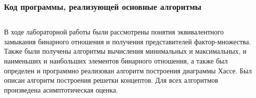 \documentclass[bachelor, och, labwork]{shiza}
\begin{document}
        \subsubsection{Код программы, реализующей основные алгоритмы}
            \inputminted{python}{code/lab2.py}
      


\conclusion
В ходе лабораторной работы были рассмотрены понятия эквивалентного замыкания
бинарного отношения и получения представителей фактор-множества. Также были
получены алгоритмы вычисления минимальных и максимальных, и наименьших и наибольших
элементов бинарного отношения, а также был определен и программно реализован
алгоритм построения диаграммы Хассе. Был описан алгоритм построения решетки
концептов. Для всех алгоритмов произведена асимптотическая оценка.
\end{document}
